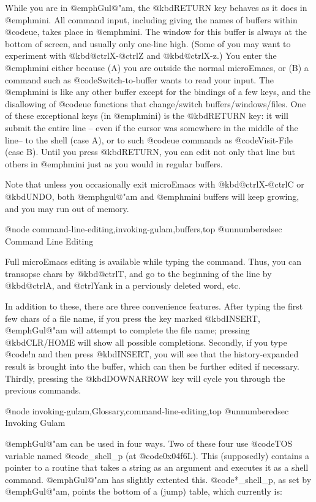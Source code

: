 {While you are in @emph{Gul@"am}, the @kbd{RETURN} key behaves as it does in
@emph{mini}.  All command input, including giving the names of buffers
within @code{ue}, takes place in @emph{mini}.  The window for this buffer
is always at the bottom of screen, and usually only one-line high.  (Some
of you may want to experiment with @kbd{@ctrl{X}-@ctrl{Z}} and
@kbd{@ctrl{X}-z}.) You enter the @emph{mini} either because (A) you are
outside the normal microEmacs, or (B) a command such as
@code{Switch-to-buffer} wants to read your input.  The @emph{mini} is like
any other buffer except for the bindings of a few keys, and the disallowing
of @code{ue} functions that change/switch buffers/windows/files.  One of
these exceptional keys (in @emph{mini}) is the @kbd{RETURN} key: it will
submit the entire line -- even if the cursor was somewhere in the middle of
the line-- to the shell (case A), or to such @code{ue} commands as
@code{Visit-File} (case B).  Until you press @kbd{RETURN}, you can edit not
only that line but others in @emph{mini} just as you would in regular
buffers.

Note that unless you occasionally exit microEmacs with
@kbd{@ctrl{X}-@ctrl{C}} or @kbd{UNDO}, both @emph{gul@"am} and @emph{mini}
buffers will keep growing, and you may run out of memory.

@node command-line-editing,invoking-gulam,buffers,top
@unnumberedsec Command Line Editing

Full microEmacs editing is available while typing the command.  Thus, you
can transopse chars by @kbd{@ctrl{T}}, and go to the beginning of the line
by @kbd{@ctrl{A}}, and @ctrl{Y}ank in a perviously deleted word, etc.

In addition to these, there are three convenience features.  After typing
the first few chars of a file name, if you press the key marked
@kbd{INSERT}, @emph{Gul@"am} will attempt to complete the file name;
pressing @kbd{CLR/HOME} will show all possible completions.  Secondly, if
you type @code{!n} and then press @kbd{INSERT}, you will see that the
history-expanded result is brought into the buffer, which can then be
further edited if necessary.  Thirdly, pressing the @kbd{DOWNARROW} key
will cycle you through the previous commands.


@node invoking-gulam,Glossary,command-line-editing,top
@unnumberedsec Invoking Gulam

@emph{Gul@"am} can be used in four ways.  Two of these four use @code{TOS}
variable named @code{_shell_p} (at @code{0x04f6L}).  This (supposedly)
contains a pointer to a routine that takes a string as an argument and
executes it as a shell command.  @emph{Gul@"am} has slightly extented this.
@code{*_shell_p}, as set by @emph{Gul@"am}, points the bottom of a (jump)
table, which currently is:

}
